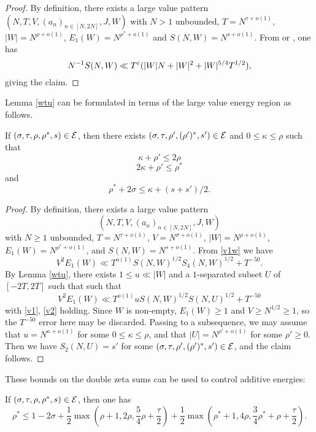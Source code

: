\literature
{}

\begin{proof} By definition, there exists a large value pattern $(N,T,V,(a_n)_{n \in [N,2N]},J,W)$ with $N>1$ unbounded, $T = N^{\tau+o(1)}$, $|W| = N^{\rho+o(1)}$, $E_1(W) = N^{\rho^*+o(1)}$ and $S(N,W) = N^{s+o(1)}$.   From \cite[Theorem 1]{heathbrown_large_1979} or \cite[Lemma 11.5]{ivic}, one has
$$ N^{-1} S(N,W) \ll T^\varepsilon ( |W| N + |W|^2 + |W|^{5/4} T^{1/2} ),$$
giving the claim.
\end{proof}

Lemma \ref{wtu} can be formulated in terms of the large value energy region as follows.

\begin{lemma}\label{wtu-alt}  If $(\sigma,\tau,\rho,\rho^*,s) \in \mathcal{E}$, then there exists $(\sigma,\tau,\rho',(\rho')^*,s') \in \mathcal{E}$ and $0 \leq \kappa \leq \rho$ such that
$$ \kappa + \rho' \leq 2 \rho$$
$$ 2\kappa + \rho' \leq \rho^*$$
and
$$ \rho^* + 2\sigma \leq \kappa + (s+s')/2.$$
\end{lemma}


\begin{proof}  By definition, there exists a large value pattern $$(N,T,V,(a_n)_{n \in [N,2N]},J,W)$$ with $N \geq 1$ unbounded, $T = N^{\tau+o(1)}$, $V = N^{\sigma+o(1)}$, $|W| = N^{\rho+o(1)}$, $E_1(W) = N^{\rho^*+o(1)}$, and $S(N,W) = N^{s+o(1)}$. From \eqref{v1w} we have
$$
    V^2 E_1(W) \ll T^{o(1)} S(N,W)^{1/2} S_4(N,W)^{1/2} + T^{-50}.
$$
By Lemma \ref{wtu}, there exists $1 \leq u \ll |W|$ and a $1$-separated subset $U$ of $[-2T,2T]$ such that
 such that
$$
    V^2 E_1(W) \ll T^{o(1)} u S(N,W)^{1/2} S(N,U)^{1/2} + T^{-50}
$$
with \eqref{v1}, \eqref{v2} holding.  Since $W$ is non-empty, $E_1(W) \geq 1$ and $V \geq N^{1/2} \geq 1$, so the $T^{-50}$ error here may be discarded.  Passing to a subsequence, we may assume that $u = N^{\kappa+o(1)}$ for some $0 \leq \kappa \leq \rho$, and that $|U| = N^{\rho'+o(1)}$ for some $\rho' \geq 0$.  Then we have $S_2(N,U) = s'$ for some
$(\sigma,\tau,\rho',(\rho')^*,s') \in \mathcal{E}$, and the claim follows.
\end{proof}

These bounds on the double zeta sums can be used to control additive energies:

\begin{theorem}\label{hbt}\cite[(33)]{heathbrown_zero_1979} If $(\sigma,\tau,\rho,\rho^*,s) \in \mathcal{E}$, then one has
$$ \rho^* \leq 1-2\sigma + \frac{1}{2}\max\left(\rho+1, 2\rho, \frac{5}{4}\rho+\frac{\tau}{2}\right) + \frac{1}{2}\max\left(\rho^*+1, 4\rho, \frac{3}{4}\rho^*+\rho+\frac{\tau}{2}\right).$$
\end{theorem}

